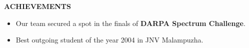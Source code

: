 \documentclass[a4paper,10pt]{article}
\begin{document}
% 
% 
% 
% 
% 



 \colorbox{titleColor}{\parbox{6.5in}{\textbf{ACHIEVEMENTS}}}

 \begin{itemize}
  \item Our team secured a spot in the finals of \textbf{DARPA Spectrum Challenge}.
 \item Best outgoing student of the year 2004 in JNV Malampuzha.
  \end{itemize}
\end{document}

